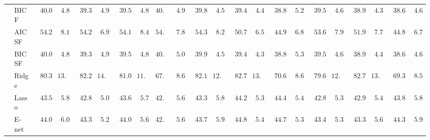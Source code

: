 \begin{tabular}{ll|ll|llllll|llllll|llllll}
 & BIC F  & $\phantom{0}40.05$ & $\phantom{0}4.89$ & $\phantom{0}39.37$ & $\phantom{0}4.98$ & $\phantom{0}39.53$ & $\phantom{0}4.85$ & $40.29$ & $\phantom{0}4.97$ & $\phantom{0}39.88$ & $\phantom{0}4.51$ & $\phantom{0}39.43$ & $\phantom{0}4.40$ & $\phantom{0}38.86$ & $\phantom{0}5.28$ & $\phantom{0}39.50$ & $\phantom{0}4.64$ & $\phantom{0}38.95$ & $\phantom{0}4.39$ & $\phantom{0}38.68$ & $\phantom{0}4.60$ \\
 & AIC SF  & $\phantom{0}54.26$ & $\phantom{0}8.17$ & $\phantom{0}54.23$ & $\phantom{0}6.93$ & $\phantom{0}54.14$ & $\phantom{0}8.43$ & $54.21$ & $\phantom{0}7.84$ & $\phantom{0}54.36$ & $\phantom{0}8.24$ & $\phantom{0}50.72$ & $\phantom{0}6.57$ & $\phantom{0}44.99$ & $\phantom{0}6.80$ & $\phantom{0}53.61$ & $\phantom{0}7.93$ & $\phantom{0}51.99$ & $\phantom{0}7.73$ & $\phantom{0}44.80$ & $\phantom{0}6.75$ \\
 & BIC SF  & $\phantom{0}40.00$ & $\phantom{0}4.83$ & $\phantom{0}39.36$ & $\phantom{0}4.97$ & $\phantom{0}39.51$ & $\phantom{0}4.85$ & $40.31$ & $\phantom{0}5.00$ & $\phantom{0}39.90$ & $\phantom{0}4.50$ & $\phantom{0}39.46$ & $\phantom{0}4.39$ & $\phantom{0}38.89$ & $\phantom{0}5.30$ & $\phantom{0}39.50$ & $\phantom{0}4.67$ & $\phantom{0}38.97$ & $\phantom{0}4.46$ & $\phantom{0}38.68$ & $\phantom{0}4.60$ \\
 & Ridge  & $\phantom{0}80.38$ & $13.51$ & $\phantom{0}82.26$ & $14.25$ & $\phantom{0}81.09$ & $11.18$ & $67.17$ & $\phantom{0}8.61$ & $\phantom{0}82.13$ & $12.49$ & $\phantom{0}82.79$ & $13.27$ & $\phantom{0}70.69$ & $\phantom{0}8.69$ & $\phantom{0}79.64$ & $12.80$ & $\phantom{0}82.72$ & $13.44$ & $\phantom{0}69.39$ & $\phantom{0}8.50$ \\
 & Lasso  & $\phantom{0}43.50$ & $\phantom{0}5.87$ & $\phantom{0}42.82$ & $\phantom{0}5.08$ & $\phantom{0}43.65$ & $\phantom{0}5.70$ & $42.61$ & $\phantom{0}5.64$ & $\phantom{0}43.32$ & $\phantom{0}5.86$ & $\phantom{0}44.21$ & $\phantom{0}5.34$ & $\phantom{0}44.44$ & $\phantom{0}5.41$ & $\phantom{0}42.88$ & $\phantom{0}5.31$ & $\phantom{0}42.92$ & $\phantom{0}5.44$ & $\phantom{0}43.84$ & $\phantom{0}5.87$ \\
 & E-net  & $\phantom{0}44.08$ & $\phantom{0}6.04$ & $\phantom{0}43.31$ & $\phantom{0}5.25$ & $\phantom{0}44.09$ & $\phantom{0}5.64$ & $42.96$ & $\phantom{0}5.67$ & $\phantom{0}43.76$ & $\phantom{0}5.98$ & $\phantom{0}44.81$ & $\phantom{0}5.47$ & $\phantom{0}44.79$ & $\phantom{0}5.37$ & $\phantom{0}43.41$ & $\phantom{0}5.39$ & $\phantom{0}43.37$ & $\phantom{0}5.61$ & $\phantom{0}44.33$ & $\phantom{0}5.91$ \\

\end{tabular}
